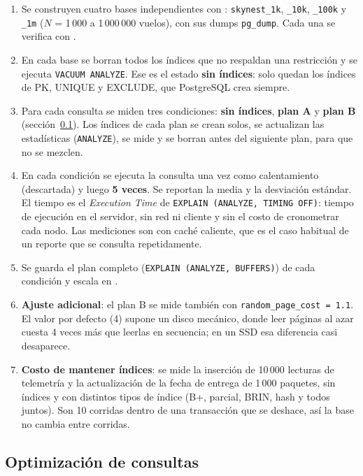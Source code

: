\begin{enumerate}[label=\arabic*.]
\item Se construyen cuatro bases independientes con : \texttt{skynest\_1k}, \texttt{\_10k}, \texttt{\_100k} y \texttt{\_1m} ($N$ = 1\,000 a 1\,000\,000 vuelos), con sus dumps \texttt{pg\_dump}. Cada una se verifica con .
\item En cada base se borran todos los índices que no respaldan una restricción y se ejecuta \texttt{VACUUM ANALYZE}. Ese es el estado \textbf{sin índices}: solo quedan los índices de PK, UNIQUE y EXCLUDE, que PostgreSQL crea siempre.
\item Para cada consulta se miden tres condiciones: \textbf{sin índices}, \textbf{plan A} y \textbf{plan B} (sección~\ref{sec:planes}). Los índices de cada plan se crean solos, se actualizan las estadísticas (\texttt{ANALYZE}), se mide y se borran antes del siguiente plan, para que no se mezclen.
\item En cada condición se ejecuta la consulta una vez como calentamiento (descartada) y luego \textbf{5 veces}. Se reportan la media y la desviación estándar. El tiempo es el \emph{Execution Time} de \texttt{EXPLAIN (ANALYZE, TIMING OFF)}: tiempo de ejecución en el servidor, sin red ni cliente y sin el costo de cronometrar cada nodo. Las mediciones son con caché caliente, que es el caso habitual de un reporte que se consulta repetidamente.
\item Se guarda el plan completo (\texttt{EXPLAIN (ANALYZE, BUFFERS)}) de cada condición y escala en .
\item \textbf{Ajuste adicional}: el plan B se mide también con \texttt{random\_page\_cost = 1.1}. El valor por defecto (4) supone un disco mecánico, donde leer páginas al azar cuesta 4 veces más que leerlas en secuencia; en un SSD esa diferencia casi desaparece.
\item \textbf{Costo de mantener índices}: se mide la inserción de 10\,000 lecturas de telemetría y la actualización de la fecha de entrega de 1\,000 paquetes, sin índices y con distintos tipos de índice (B+, parcial, BRIN, hash y todos juntos). Son 10 corridas dentro de una transacción que se deshace, así la base no cambia entre corridas.
\end{enumerate}

\subsection{Optimización de consultas}
\label{sec:planes}

